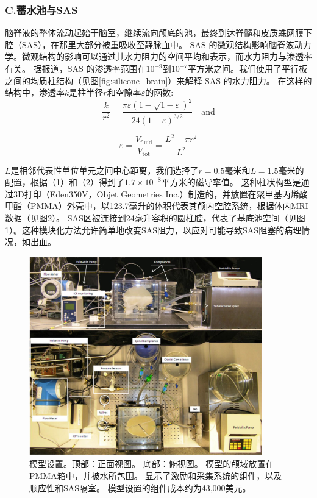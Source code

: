 \documentclass[12pt]{article}
\begin{document}
\subsubsection*{C.蓄水池与SAS}
脑脊液的整体流动起始于脑室，继续流向颅底的池，最终到达脊髓和皮质蛛网膜下腔（SAS），在那里大部分被重吸收至静脉血中。
SAS 的微观结构影响脑脊液动力学。微观结构的影响可以通过其水力阻力的空间平均和表示，而水力阻力与渗透率有关。
据报道，SAS 的渗透率范围在$10^{-9}$到$10^{-7}$平方米之间。我们使用了平行板之间的均质柱结构（见图\ref{fig:silicone_brain}）来解释 SAS 的水力阻力。
在这样的结构中，渗透率$k$是柱半径$r$和空隙率$\varepsilon$的函数:
\begin{equation}
    \frac{k}{r^2} = \frac{\pi \varepsilon \left(1 - \sqrt{1 - \varepsilon}\right)^2}{24 \left(1 - \varepsilon\right)^{3/2}} \quad \text{and}
\end{equation}

\begin{equation}
    \varepsilon = \frac{V_{\text{fluid}}}{V_{\text{tot}}} = \frac{L^2 - \pi r^2}{L^2}
\end{equation}

$L$是相邻代表性单位单元之间中心距离，我们选择了$r = 0.5$毫米和$L = 1.5$毫米的配置，根据（1）和（2）得到了$1.7×10^{−8}$平方米的磁导率值。
这种柱状构型是通过3D打印（Eden350V，Objet Geometries Inc.）制造的，并放置在聚甲基丙烯酸甲酯（PMMA）外壳中，以123.7毫升的体积代表其颅内空腔系统，根据体内MRI数据（见图2）。
SAS区被连接到24毫升容积的圆柱腔，代表了基底池空间（见图1）。这种模块化方法允许简单地改变SAS阻力，以应对可能导致SAS阻塞的病理情况，如出血。

\begin{figure}[h]
    \centering
    \includegraphics[width=0.9\textwidth]{Figures/4.png}
    \caption{模型设置。顶部：正面视图。 底部：俯视图。 模型的颅域放置在PMMA箱中，并被水所包围。 显示了激励和采集系统的组件，以及顺应性和SAS隔室。 模型设置的组件成本约为43,000美元。}
    \label{fig:csf_flow_path}
\end{figure}
\end{document}
